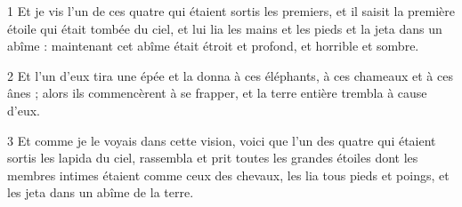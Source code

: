 \par 1 Et je vis l'un de ces quatre qui étaient sortis les premiers, et il saisit la première étoile qui était tombée du ciel, et lui lia les mains et les pieds et la jeta dans un abîme : maintenant cet abîme était étroit et profond, et horrible et sombre.
\par 2 Et l'un d'eux tira une épée et la donna à ces éléphants, à ces chameaux et à ces ânes ; alors ils commencèrent à se frapper, et la terre entière trembla à cause d'eux.
\par 3 Et comme je le voyais dans cette vision, voici que l'un des quatre qui étaient sortis les lapida du ciel, rassembla et prit toutes les grandes étoiles dont les membres intimes étaient comme ceux des chevaux, les lia tous pieds et poings, et les jeta dans un abîme de la terre.


